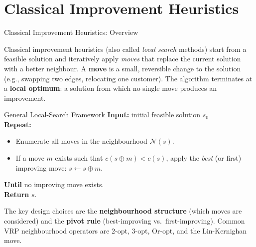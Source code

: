 \documentclass[aspectratio=169,10pt]{beamer}
\begin{document}
\section{Classical Improvement Heuristics}

\begin{frame}[allowframebreaks]{Classical Improvement Heuristics: Overview}

  Classical improvement heuristics (also called \emph{local search}
  methods) start from a feasible solution and iteratively apply
  \emph{moves} that replace the current solution with a better neighbour.
  A \textbf{move} is a small, reversible change to the solution (e.g.,
  swapping two edges, relocating one customer).  The algorithm terminates
  at a \textbf{local optimum}: a solution from which no single move
  produces an improvement.

  \begin{block}{General Local-Search Framework}
    \textbf{Input:} initial feasible solution $s_0$ \\
    \textbf{Repeat:}
    \begin{itemize}
      \item Enumerate all moves in the neighbourhood $\mathcal{N}(s)$.
      \item If a move $m$ exists such that $c(s \oplus m) < c(s)$, apply
            the \emph{best} (or first) improving move: $s \leftarrow s \oplus m$.
    \end{itemize}
    \textbf{Until} no improving move exists.  \\
    \textbf{Return} $s$.
  \end{block}

  The key design choices are the \textbf{neighbourhood structure}
  (which moves are considered) and the \textbf{pivot rule} (best-improving
  vs.\ first-improving).  Common VRP neighbourhood operators are
  2-opt, 3-opt, Or-opt, and the Lin-Kernighan move.

\end{frame}
\end{document}

